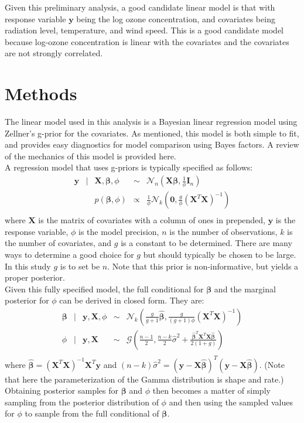 \documentclass{../../tex_template/asaproc}
\newcommand{\p}[1]{\left(#1\right)}
\newcommand{\y}{\bm y}
\newcommand{\X}{\bm X}
\newcommand{\Xb}{\bm {X\beta}}
\newcommand{\bh}{\bm{\hat\beta}}
\newcommand{\XXi}{(\X^T\X)^{-1}}
\begin{document}
Given this preliminary analysis, a good candidate linear model is that with
response variable $\y$ being the log ozone concentration, and covariates being
radiation level, temperature, and wind speed. This is a good candidate model
because log-ozone concentration is linear with the covariates and the 
covariates are not strongly correlated.

\section{Methods}
The linear model used in this analysis is a Bayesian linear regression model
using Zellner's g-prior for the covariates. As mentioned, this model is both
simple to fit, and provides easy diagnostics for model comparison using 
Bayes factors. A review of the mechanics of this model is provided here.\\

A regression model that uses g-priors is typically specified as follows:
\[
  \begin{array}{rclcl}
    \y &|& \X,\bm\beta,\phi &\sim& \mathcal{N}_n\p{\Xb,\frac{1}{\phi}\bm I_n} \\
       && p(\bm\beta,\phi) &\propto& \frac{1}{\phi} \mathcal{N}_k (\bm 0, \frac{g}{\phi} (\X^T\X)^{-1})\\
  \end{array}
\]
where $\X$ is the matrix of covariates with a column of ones in prepended, $\y$
is the response variable, $\phi$ is the model precision, $n$ is the number of
observations, $k$ is the number of covariates, and $g$ is a constant to be
determined. There are many ways to determine a good choice for $g$ but should
typically be chosen to be large. In this study $g$ is to set be $n$. Note that
this prior is non-informative, but yields a proper posterior. \\

Given this fully specified model, the full conditional for $\bm\beta$ and
the marginal posterior for $\phi$ can be derived in closed form. They are:
\[
  \begin{array}{rclcl}
    \bm\beta &|& \y,\X,\phi &\sim& \mathcal{N}_k\p{\frac{g}{g+1}\bh, \frac{g}{(g+1)\phi} \XXi}\\
    \phi &|& \y,\X &\sim& \mathcal{G}\p{\frac{n-1}{2},\frac{n-k}{2}\hat\sigma^2+\frac{\bh^T\X^T\X\bh}{2(1+g)}}\\
  \end{array}
\]
where $\bh = \XXi\X^T\y$ and $(n-k) \hat\sigma^2 = (\y-\X\bh)^T(\y-\X\bh)$. 
(Note that here the parameterization of the Gamma distribution is shape and
rate.) Obtaining posterior samples for $\bm\beta$ and $\phi$ then becomes a
matter of simply sampling from the posterior distribution of $\phi$ and then
using the sampled values for $\phi$ to sample from the full conditional of 
$\bm\beta$. \\
\end{document}
